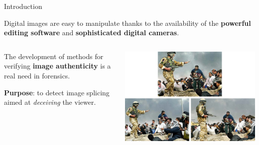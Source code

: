 
\begin{tframe}{Introduction}

\vspace{0.5cm}
Digital images are easy to manipulate thanks to the availability of the \textbf{powerful editing software} and \textbf{sophisticated digital cameras}.

\vspace{1cm}

\begin{minipage}{\textwidth}
\begin{columns}[T]
\begin{column}{0.46\textwidth}
\vspace{0.1cm}
The development of methods for verifying \textbf{image authenticity} is a real need in forensics.

\vspace{0.8cm}
\textbf{Purpose}: to detect image splicing  aimed at \emph{deceiving} the viewer.
\end{column}
\begin{column}{0.45\textwidth}
\includegraphics[width=1\textwidth]{images/iraq.jpg}
\end{column}
\end{columns}
\end{minipage}

\end{tframe}



